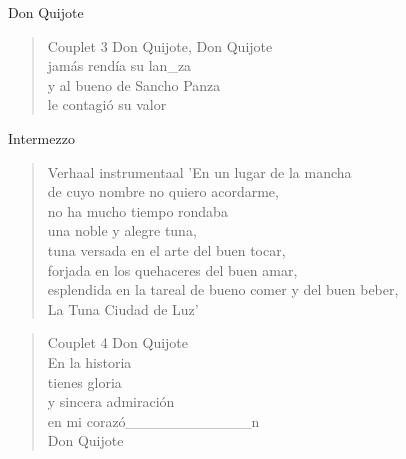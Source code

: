 \begin{song}{Don Quijote}
\begin{verse}{Couplet 3}
Don Quijote, Don Quijote\\
jamás rendía su lan\_za\\
y al bueno de Sancho Panza\\
le contagió su valor\hspace{3em}
\end{verse}

\clearpage
\begin{instrumental}{Intermezzo}
\measure{}\measure{}\measure{}\measure{}\measure{}\measure{}\measure{}\measure{}\measure{}\measure{}\measure{}\measure{}\measure{}\measure{}\measure{}\measure{}
\end{instrumental}

\begin{verse}{Verhaal instrumentaal}
'En un lugar de la mancha\\
de cuyo nombre no quiero acordarme,\\
no ha mucho tiempo rondaba\\
una noble y alegre tuna,\\
tuna versada en el arte del buen tocar,\\
forjada en los quehaceres del buen amar,\\
esplendida en la tareal de bueno comer y del buen beber,\\
La Tuna Ciudad de Luz'
\end{verse}


\begin{verse}{Couplet 4}
Don Quijote \\
En la historia\\
tienes gloria\\
y sincera admiración\hspace{1em}\\
en mi corazó\_\_\_\_\_\_\_\_\_\_\_\_n\\
Don Quijote  
\end{verse}
\end{song}
